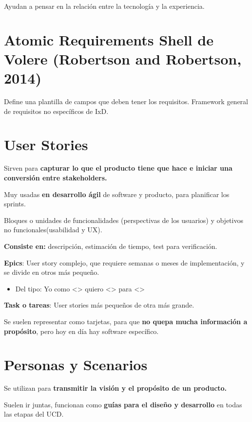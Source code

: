 \documentclass[12pt]{report} %
\begin{document}
Ayudan a pensar en la relación entre la tecnología y la experiencia.

\section{Atomic Requirements Shell de Volere (Robertson and
Robertson, 2014)}

Define una plantilla de campos que deben tener los requisitos. Framework
general de requisitos no específicos de IxD.

\section{User Stories}

Sirven para \textbf{capturar lo que el producto tiene que hace e iniciar
una conversión entre stakeholders.}

Muy usadas \textbf{en desarrollo ágil} de software y producto, para
planificar los sprints.

Bloques o unidades de funcionalidades (perspectivas de los usuarios) y
objetivos no funcionales(usabilidad y UX).

\textbf{Consiste en:} descripción, estimación de tiempo, test para
verificación.

\textbf{Epics}: User story complejo, que requiere semanas o meses de
implementación, y se divide en otros más pequeño.

\begin{itemize}

\item
  Del tipo: Yo como \textless\textgreater{} quiero
  \textless\textgreater{} para \textless\textgreater{}
\end{itemize}

\textbf{Task o tareas}: User stories más pequeños de otra más grande.

Se suelen representar como tarjetas, para que \textbf{no quepa mucha
información a propósito}, pero hoy en día hay software específico.

\section{Personas y Scenarios}

Se utilizan para \textbf{transmitir la visión y el propósito de un
producto.}

Suelen ir juntas, funcionan como \textbf{guías para el diseño y
desarrollo} en todas las etapas del UCD.
\end{document}
